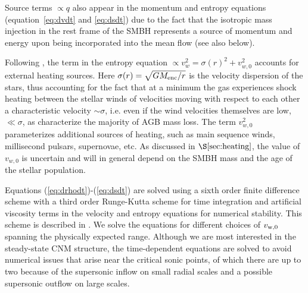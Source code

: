 \documentclass[usenatbib,fleqn]{mn2e}
\newcommand{\vw}{v_w}
\begin{document}
Source terms $\propto q$ also appear in the momentum and entropy
equations (equation~\ref{eq:dvdt} and \ref{eq:dsdt}) due to the fact
that the isotropic mass injection in the rest frame of the SMBH
represents a source of momentum and energy upon being incorporated
into the mean flow (see also below).  


Following \citet{ShcherbakovWong+:2014a}, the term in the entropy
equation $\propto \vw^2 = \sigma(r)^2+v_{w,0}^2$ accounts for external
heating sources.  Here $\sigma(r) = \sqrt{GM_{\rm enc}/r}$ is the
velocity dispersion of the stars, thus accounting for the fact that at
a minimum the gas experiences shock heating between the stellar winds
of velocities moving with respect to each other a characteristic
velocity $\sim \sigma$, i.e. even if the wind velocities themselves
are low, $\ll \sigma$, as characterize the majority of AGB mass loss.
The term $v_{w,0}^{2}$ parameterizes additional sources of heating,
such as main sequence winds, millisecond pulsars, supernovae, etc.  As
discussed in $\S\ref{sec:heating}$, the value of $v_{w,0}$ is
uncertain and will in general depend on the SMBH mass and the age of
the stellar population.

Equations (\ref{eq:drhodt})-(\ref{eq:dsdt}) are solved using a sixth
order finite difference scheme with a third order Runge-Kutta scheme
for time integration and artificial viscosity terms in the velocity
and entropy equations for numerical stability. This scheme is
described in \citealt{Brandenburg:2003a}.  We solve the equations for
different choices of $v_{\rm w,0}$ spanning the physically expected
range.  Although we are most interested in the steady-state CNM
structure, the time-dependent equations are solved to avoid numerical
issues that arise near the critical sonic points, of which there are
up to two because of the supersonic inflow on small radial scales and
a possible supersonic outflow on large scales.
\end{document}
